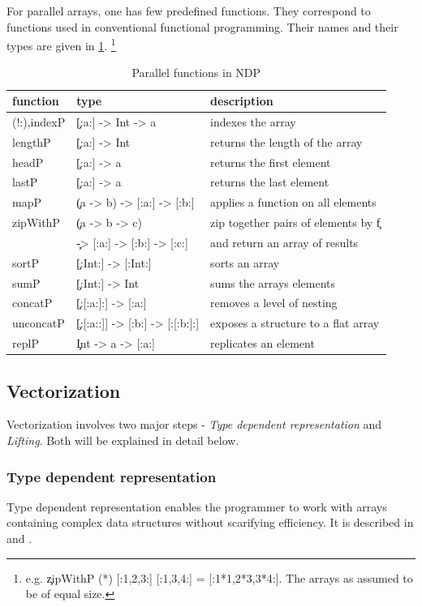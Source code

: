   \p
  For parallel arrays, one has few predefined functions.
  They correspond to functions used in conventional functional programming.
  Their names and their types are given in \ref{table:parfuns}.
  \footnote{e.g. \c{zipWithP (*) [:1,2,3:] [:1,3,4:] = [:1*1,2*3,3*4:]}. The arrays as assumed to be of equal size.}
  \begin{table}[h]
    \caption{Parallel functions in NDP}
    \label{table:parfuns}
    \begin{tabular}{lll}
        \toprule
        function & type & description \\
        \midrule
        (!:),indexP & \c{[:a:] -> Int -> a} & indexes the array \\
        lengthP & \c{[:a:] -> Int} & returns the length of the array \\
        headP & \c{[:a:] -> a} & returns the first element\\
        lastP & \c{[:a:] -> a} & returns the last element \\
        mapP & \c{(a -> b) -> [:a:] -> [:b:]} & applies a function on all elements \\
        zipWithP & \c{(a -> b -> c)} & zip together pairs of elements by \c{f} \\
         & \c{-> [:a:] -> [:b:] -> [:c:]} & and return an array of results \\
        sortP & \c{[:Int:] -> [:Int:]} & sorts an array \\
        sumP & \c{[:Int:] -> Int} & sums the arrays elements \\
        concatP & \c{[:[:a:]:] -> [:a:]} & removes a level of nesting \\
        unconcatP & \c{[:[:a::]] -> [:b:] -> [:[:b:]:]} & exposes a structure to a flat array \\
        replP & \c{Int -> a -> [:a:]} & replicates an element \\
    \end{tabular}
  \end{table}
    
  \subsection{Vectorization}
    Vectorization involves two major steps -
    \emph{Type dependent representation} and \emph{Lifting}.
    Both will be explained in detail below.
  
    \subsubsection{Type dependent representation}
      Type dependent representation enables the programmer
      to work with arrays containing complex
      data structures without scarifying efficiency.
      It is described in 
      \cite{FastArr2003Chakravarty}
      and \cite{DataFamily2005Chakravarty}.
      
